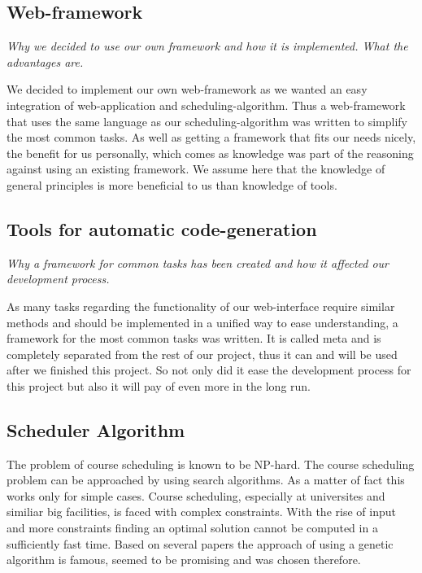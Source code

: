 \subsection{Web-framework}

\emph{Why we decided to use our own framework and how it is implemented. What the advantages are.}

We decided to implement our own web-framework as we wanted an easy integration of web-application and scheduling-algorithm. Thus a web-framework that uses the same language as our scheduling-algorithm was written to simplify the most common tasks. As well as getting a framework that fits our needs nicely, the benefit for us personally, which comes as knowledge was part of the reasoning against using an existing framework. We assume here that the knowledge of general principles is more beneficial to us than knowledge of tools.

\subsection{Tools for automatic code-generation}

\emph{Why a framework for common tasks has been created and how it affected our development process.}

As many tasks regarding the functionality of our web-interface require similar methods and should be implemented in a unified way to ease understanding, a framework for the most common tasks was written. It is called meta and is completely separated from the rest of our project, thus it can and will be used after we finished this project. So not only did it ease the development process for this project but also it will pay of even more in the long run.

\subsection{Scheduler Algorithm}
The problem of course scheduling is known to be NP-hard. The course scheduling problem can be approached by using search algorithms. As a matter of fact this works only for simple cases. Course scheduling, especially at universites and similiar big facilities, is faced with complex constraints. With the rise of input and more constraints finding an optimal solution cannot be computed in a sufficiently fast time. Based on several papers the approach of using a genetic algorithm is famous, seemed to be promising and was chosen therefore.

